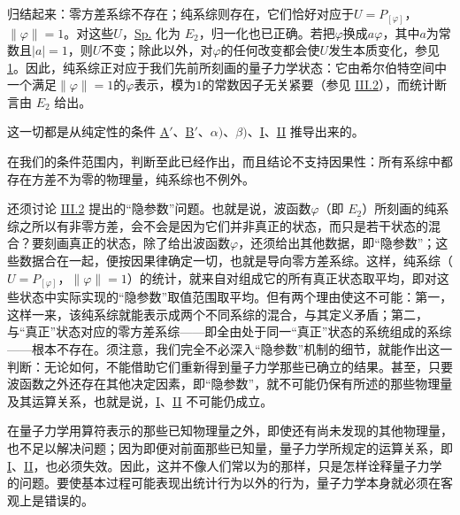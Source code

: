 \documentclass[fontsize=13pt,twoside,openany,headings=normal,parskip=false,bookmarkpackage=false,DIV=calc]{scrbook}
\begin{document}
归结起来：零方差系综不存在；纯系综则存在，它们恰好对应于$U=P_{[\varphi]}$，$\|\varphi\|=1$。对这些$U$，\hyperref[eq:IV.2.Sp]{Sp.} 化为 \hyperref[eq:IV.2.E2]{$E_2$}，归一化也已正确。若把$\varphi$换成$a\varphi$，其中$a$为常数且$|a|=1$，则$U$不变；除此以外，对$\varphi$的任何改变都会使$U$发生本质变化，参见 \hyperref[remark:IV.2.1]{1}。因此，纯系综正对应于我们先前所刻画的量子力学状态：它由希尔伯特空间中一个满足$\|\varphi\|=1$的$\varphi$表示，模为$1$的常数因子无关紧要（参见 \hyperref[sec:III.2]{III.2}），而统计断言由 \hyperref[eq:IV.2.E2]{$E_2$} 给出。

这一切都是从纯定性的条件 \hyperref[cond:IV.Aprime]{A$'$}、\hyperref[cond:IV.Bprime]{B$'$}、\hyperref[def:IV.1.alpha]{$\alpha)$}、\hyperref[def:IV.1.beta]{$\beta)$}、\hyperref[cond:IV.2.I]{I}、\hyperref[cond:IV.2.II]{II} 推导出来的。

在我们的条件范围内，判断至此已经作出，而且结论不支持因果性：所有系综中都存在方差不为零的物理量，纯系综也不例外。

还须讨论 \hyperref[sec:III.2]{III.2} 提出的“隐参数”问题。也就是说，波函数$\varphi$（即 \hyperref[eq:IV.2.E2]{$E_2$}）所刻画的纯系综之所以有非零\hypertarget{origpage-171}{}\label{origpage-171}方差，会不会是因为它们并非真正的状态，而只是若干状态的混合？要刻画真正的状态，除了给出波函数$\varphi$，还须给出其他数据，即“隐参数”；这些数据合在一起，便按因果律确定一切，也就是导向零方差系综。这样，纯系综（$U=P_{[\varphi]}$，$\|\varphi\|=1$）的统计，就来自对组成它的所有真正状态取平均，即对这些状态中实际实现的“隐参数”取值范围取平均。但有两个理由使这不可能：第一，这样一来，该纯系综就能表示成两个不同系综的混合，与其定义矛盾；第二，与“真正”状态对应的零方差系综——即全由处于同一“真正”状态的系统组成的系综——根本不存在。须注意，我们完全不必深入“隐参数”机制的细节，就能作出这一判断：无论如何，不能借助它们重新得到量子力学那些已确立的结果。甚至，只要波函数之外还存在其他决定因素，即“隐参数”，就不可能仍保有所述的那些物理量及其运算关系，也就是说，\hyperref[cond:IV.2.I]{I}、\hyperref[cond:IV.2.II]{II} 不可能仍成立。

在量子力学用算符表示的那些已知物理量之外，即使还有尚未发现的其他物理量，也不足以解决问题；因为即便对前面那些已知量，量子力学所规定的运算关系，即 \hyperref[cond:IV.2.I]{I}、\hyperref[cond:IV.2.II]{II}，也必须失效。因此，这并不像人们常以为的那样，只是怎样诠释量子力学的问题。要使基本过程可能表现出统计行为以外的行为，量子力学本身就必须在客观上是错误的。
\end{document}
